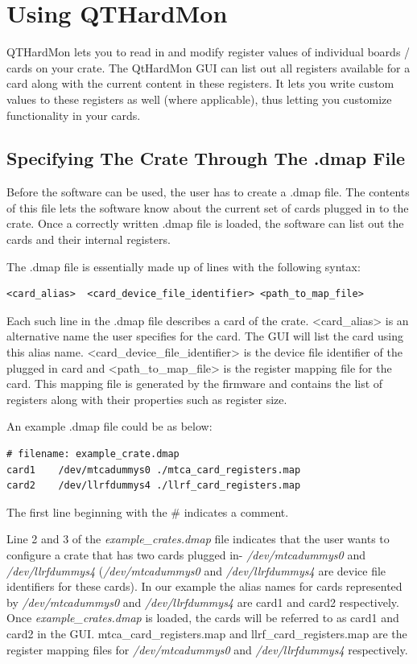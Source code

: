 \chapter{Using QTHardMon}

QTHardMon lets you to read in and modify register values of individual boards / cards on your crate. The QtHardMon GUI can list out all registers available for a card along with the current content in these registers. It lets you write custom values to these registers as well (where applicable), thus letting you customize functionality in your cards.

\section{Specifying The Crate Through The .dmap File}
Before the software can be used, the user has to create a .dmap file. The contents of this file lets the software know about the current set of cards plugged in to the crate. Once a correctly written .dmap file is loaded, the software can list out the cards and their internal registers. 

The .dmap file is essentially made up of lines with the following syntax:
\begin{lstlisting}
<card_alias>  <card_device_file_identifier> <path_to_map_file>
\end{lstlisting}

Each such line in the .dmap file describes a card of the crate.
\mbox{\textless card\_alias\textgreater}  is an alternative name the user specifies for the card. The GUI will list the card using this alias name.
\mbox{\textless card\_device\_file\_identifier\textgreater} is the device file identifier of the plugged in card and \mbox{\textless path\_to\_map\_file\textgreater} is the register mapping file for the card. This mapping file is generated by the firmware and contains the list of registers along with their properties such as register size.
	

An example .dmap file could be as below:
\begin{lstlisting}
# filename: example_crate.dmap
card1    /dev/mtcadummys0 ./mtca_card_registers.map
card2    /dev/llrfdummys4 ./llrf_card_registers.map
\end{lstlisting}


The first line beginning with the \# indicates a comment. 

Line 2 and 3 of the \textit{example\_crates.dmap} file indicates that the user wants to configure a crate that has two cards plugged in- \textit{/dev/mtcadummys0} and \textit{/dev/llrfdummys4} (\textit{/dev/mtcadummys0} and \textit{/dev/llrfdummys4} are device file identifiers for these cards).  In our example the alias names for cards represented by \textit{/dev/mtcadummys0} and \textit{/dev/llrfdummys4} are card1 and card2 respectively. Once \textit{example\_crates.dmap} is loaded, the cards will be referred to as card1 and card2 in the GUI.
mtca\_card\_registers.map and llrf\_card\_registers.map are the register mapping files for \textit{/dev/mtcadummys0} and \textit{/dev/llrfdummys4} respectively. 


